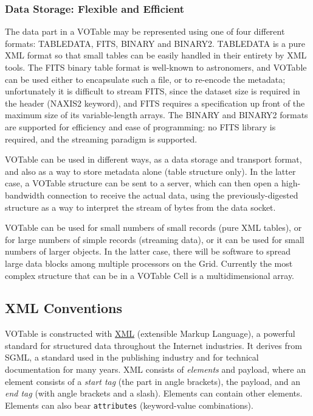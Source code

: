 \documentclass[11pt,a4paper]{ivoa}
\let\A=\href
\let\fg=\color
\def\attr#1{{\tt{\fg{DarkRed}#1}}}
\begin{document}
\subsubsection*{Data Storage: Flexible and Efficient}

The data part in a  VOTable may be represented using one of four
different formats: TABLEDATA, FITS, BINARY and BINARY2. TABLEDATA is a
pure XML format so that small tables can be easily handled in their
entirety by XML tools. The FITS binary table format is well-known to
astronomers, and VOTable can be used either to encapsulate such a
file, or to re-encode the metadata; unfortunately it is difficult to
stream FITS, since the dataset size is required in the header
(NAXIS2 keyword), and FITS requires a specification up front of the maximum
size of its variable-length arrays. The BINARY and BINARY2 formats
are supported for efficiency and ease of programming: no FITS
library is required, and the streaming paradigm is supported.

VOTable can be used in different ways, as a data
storage and transport format, and also as a way to store metadata
alone (table structure only).  In the latter case, a
VOTable structure can be sent to a server, which can then open a
high-bandwidth connection to receive the actual data, using the
previously-digested structure as a way to interpret the stream of
bytes from the data socket.

VOTable can be used for small numbers of small records (pure XML
tables), or for large numbers of simple records (streaming data), or
it can be used for small numbers of larger objects. In the latter
case, there will be software to spread large data blocks among
multiple processors on the Grid. Currently the most complex structure
that can be in a VOTable Cell is a multidimensional array.


\subsection{XML Conventions}

VOTable is constructed with \A{http://www.w3.org/XML/}{XML} (extensible Markup Language), a
powerful standard for structured data throughout the Internet
industries. It derives %
from SGML, %
a standard used in the publishing industry and for
technical documentation for many years. XML
consists of {\it elements} and payload, where an element consists of
a {\it start tag} (the part in angle brackets), the payload, and an
{\it end tag} (with angle brackets and a slash). Elements can
contain other elements. Elements can also bear
{\attr{attributes}}
(keyword-value combinations).
\end{document}
